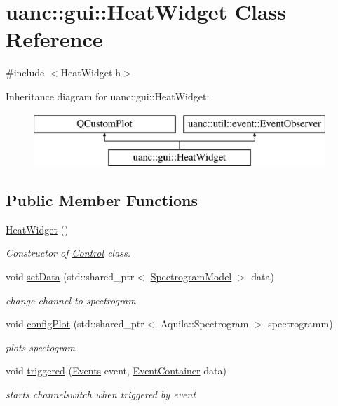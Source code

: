 \hypertarget{classuanc_1_1gui_1_1_heat_widget}{}\section{uanc\+:\+:gui\+:\+:Heat\+Widget Class Reference}
\label{classuanc_1_1gui_1_1_heat_widget}


{\ttfamily \#include $<$Heat\+Widget.\+h$>$}

Inheritance diagram for uanc\+:\+:gui\+:\+:Heat\+Widget\+:\begin{figure}[H]
\begin{center}
\leavevmode
\includegraphics[height=2.000000cm]{classuanc_1_1gui_1_1_heat_widget}
\end{center}
\end{figure}
\subsection*{Public Member Functions}
\begin{DoxyCompactItemize}
\item 
\hyperlink{classuanc_1_1gui_1_1_heat_widget_ad2ab17fd2d3cf74fb5f6d973e5689f74}{Heat\+Widget} ()
\begin{DoxyCompactList}\small\item\em Constructor of \hyperlink{classuanc_1_1gui_1_1_control}{Control} class. \end{DoxyCompactList}\item 
void \hyperlink{classuanc_1_1gui_1_1_heat_widget_aabf936a98a00a3934278cd490be16793}{set\+Data} (std\+::shared\+\_\+ptr$<$ \hyperlink{classuanc_1_1amv_1_1signal_1_1model_1_1_spectrogram_model}{Spectrogram\+Model} $>$ data)
\begin{DoxyCompactList}\small\item\em change channel to spectrogram \end{DoxyCompactList}\item 
void \hyperlink{classuanc_1_1gui_1_1_heat_widget_a3d97fc4b902d3a90a197124b190deebd}{config\+Plot} (std\+::shared\+\_\+ptr$<$ Aquila\+::\+Spectrogram $>$ spectrogramm)
\begin{DoxyCompactList}\small\item\em plots spectogram \end{DoxyCompactList}\item 
void \hyperlink{classuanc_1_1gui_1_1_heat_widget_afe92e65ebf7d607ef7e1d40aaaa6131a}{triggered} (\hyperlink{namespaceuanc_1_1util_1_1event_a63f690675589114db9c6bcbe6f1088a4}{Events} event, \hyperlink{classuanc_1_1util_1_1event_1_1_event_container}{Event\+Container} data)
\begin{DoxyCompactList}\small\item\em starts channelswitch when triggered by event \end{DoxyCompactList}\end{DoxyCompactItemize}


